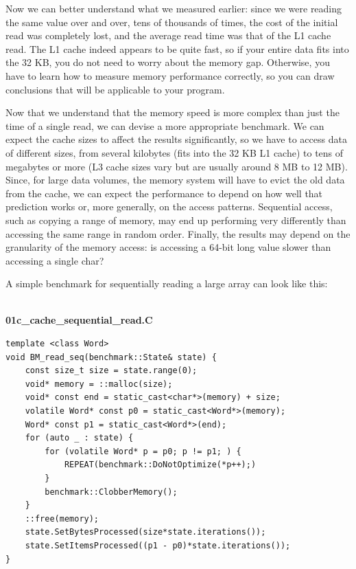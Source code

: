 Now we can better understand what we measured earlier: since we were reading the same value over and over, tens of thousands of times, the cost of the initial read was completely lost, and the average read time was that of the L1 cache read. The L1 cache indeed appears to be quite fast, so if your entire data fits into the 32 KB, you do not need to worry about the memory gap. Otherwise, you have to learn how to measure memory performance correctly, so you can draw conclusions that will be applicable to your program.


Now that we understand that the memory speed is more complex than just the time of a single read, we can devise a more appropriate benchmark. We can expect the cache sizes to affect the results significantly, so we have to access data of different sizes, from several kilobytes (fits into the 32 KB L1 cache) to tens of megabytes or more (L3 cache sizes vary but are usually around 8 MB to 12 MB). Since, for large data volumes, the memory system will have to evict the old data from the cache, we can expect the performance to depend on how well that prediction works or, more generally, on the access patterns. Sequential access, such as copying a range of memory, may end up performing very differently than accessing the same range in random order. Finally, the results may depend on the granularity of the memory access: is accessing a 64-bit long value slower than accessing a single char?

A simple benchmark for sequentially reading a large array can look like this:

\hspace*{\fill} \\ %
\noindent
\textbf{01c\_cache\_sequential\_read.C}
\begin{lstlisting}[style=styleCXX]
template <class Word>
void BM_read_seq(benchmark::State& state) {
	const size_t size = state.range(0);
	void* memory = ::malloc(size);
	void* const end = static_cast<char*>(memory) + size;
	volatile Word* const p0 = static_cast<Word*>(memory);
	Word* const p1 = static_cast<Word*>(end);
	for (auto _ : state) {
		for (volatile Word* p = p0; p != p1; ) {
			REPEAT(benchmark::DoNotOptimize(*p++);)
		}
		benchmark::ClobberMemory();
	}
	::free(memory);
	state.SetBytesProcessed(size*state.iterations());
	state.SetItemsProcessed((p1 - p0)*state.iterations());
}
\end{lstlisting}

